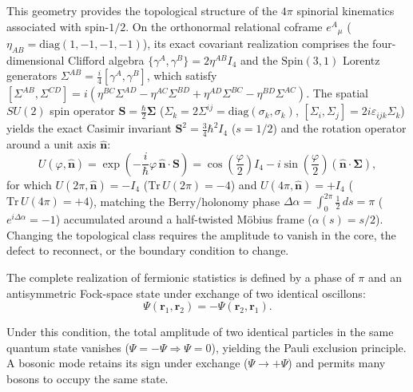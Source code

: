 \documentclass[11pt,a4paper]{article}
\begin{document}
This geometry provides the topological structure of the $4\pi$ spinorial kinematics associated with spin-$1/2$. On the orthonormal relational coframe $e^A{}_\mu$ ($\eta_{AB} = \mathrm{diag}(1,-1,-1,-1)$), its exact covariant realization comprises the four-dimensional Clifford algebra $\{\gamma^A, \gamma^B\} = 2\eta^{AB}I_4$ and the $\mathrm{Spin}(3,1)$ Lorentz generators $\Sigma^{AB} = \frac{i}{4}[\gamma^A, \gamma^B]$, which satisfy $[\Sigma^{AB}, \Sigma^{CD}] = i(\eta^{BC}\Sigma^{AD} - \eta^{AC}\Sigma^{BD} + \eta^{AD}\Sigma^{BC} - \eta^{BD}\Sigma^{AC})$. The spatial $SU(2)$ spin operator $\mathbf{S} = \frac{\hbar}{2}\boldsymbol{\Sigma}$ ($\Sigma_k = 2\Sigma^{ij} = \mathrm{diag}(\sigma_k, \sigma_k)$, $[\Sigma_i, \Sigma_j] = 2i\varepsilon_{ijk}\Sigma_k$) yields the exact Casimir invariant $\mathbf{S}^2 = \frac{3}{4}\hbar^2 I_4$ ($s = 1/2$) and the rotation operator around a unit axis $\hat{\mathbf{n}}$:
\begin{equation}
U(\varphi, \hat{\mathbf{n}}) = \exp\!\left(-\frac{i}{\hbar}\varphi\,\hat{\mathbf{n}}\cdot\mathbf{S}\right) = \cos\!\left(\frac{\varphi}{2}\right)I_4 - i\sin\!\left(\frac{\varphi}{2}\right)(\hat{\mathbf{n}}\cdot\boldsymbol{\Sigma}),
\end{equation}
for which $U(2\pi, \hat{\mathbf{n}}) = -I_4$ ($\mathrm{Tr}\,U(2\pi) = -4$) and $U(4\pi, \hat{\mathbf{n}}) = +I_4$ ($\mathrm{Tr}\,U(4\pi) = +4$), matching the Berry/holonomy phase $\Delta\alpha = \int_0^{2\pi}\frac{1}{2}\,ds = \pi$ ($e^{i\Delta\alpha} = -1$) accumulated around a half-twisted Möbius frame ($\alpha(s) = s/2$). Changing the topological class requires the amplitude to vanish in the core, the defect to reconnect, or the boundary condition to change.

The complete realization of fermionic statistics is defined by a phase of $\pi$ and an antisymmetric Fock-space state under exchange of two identical oscillons:
\begin{equation}
\Psi(\mathbf{r}_1, \mathbf{r}_2) = -\Psi(\mathbf{r}_2, \mathbf{r}_1).
\end{equation}

Under this condition, the total amplitude of two identical particles in the same quantum state vanishes ($\Psi=-\Psi\Rightarrow\Psi=0$), yielding the Pauli exclusion principle. A bosonic mode retains its sign under exchange ($\Psi\to+\Psi$) and permits many bosons to occupy the same state.
\end{document}
